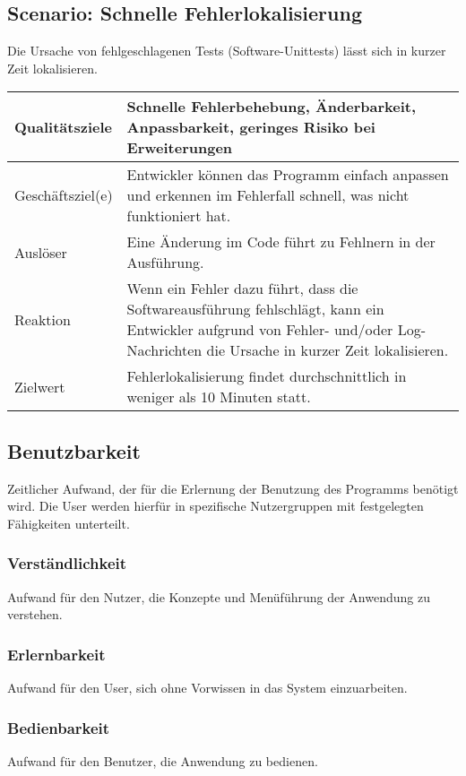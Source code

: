 \documentclass[
	ngerman,
	toc=listof, %
	toc=bibliography, %
	footnotes=multiple, %
	parskip=half, %
	numbers=noendperiod %
]{scrartcl}
\begin{document}
		\subsection{Scenario: Schnelle Fehlerlokalisierung}
			Die Ursache von fehlgeschlagenen Tests (Software-Unittests) lässt sich in kurzer Zeit lokalisieren.

			\begin{tabularx}{\textwidth}{lX}
				\toprule
				Qualitätsziele & Schnelle Fehlerbehebung, Änderbarkeit, Anpassbarkeit, geringes Risiko bei Erweiterungen  \\
				\midrule
				Geschäftsziel(e) & Entwickler können das Programm einfach anpassen und erkennen im Fehlerfall schnell, was nicht funktioniert hat.  \\
				\midrule
				Auslöser & Eine Änderung im Code führt zu Fehlnern in der Ausführung.  \\
				\midrule
				Reaktion & Wenn ein Fehler dazu führt, dass die Softwareausführung fehlschlägt, kann ein Entwickler aufgrund von Fehler- und/oder Log-Nachrichten die Ursache in kurzer Zeit lokalisieren.  \\
				\midrule
				Zielwert & Fehlerlokalisierung findet durchschnittlich in weniger als 10 Minuten statt.  \\
				\bottomrule
			\end{tabularx}

	\subsection{Benutzbarkeit}
		Zeitlicher Aufwand, der für die Erlernung der Benutzung des Programms benötigt wird. Die User werden hierfür in spezifische Nutzergruppen mit festgelegten Fähigkeiten unterteilt.
		
		\subsubsection{Verständlichkeit}
			Aufwand für den Nutzer, die Konzepte und Menüführung der Anwendung zu verstehen.

		\subsubsection{Erlernbarkeit}
			Aufwand für den User, sich ohne Vorwissen in das System einzuarbeiten.

		\subsubsection{Bedienbarkeit}
			Aufwand für den Benutzer, die Anwendung zu bedienen.
\end{document}
